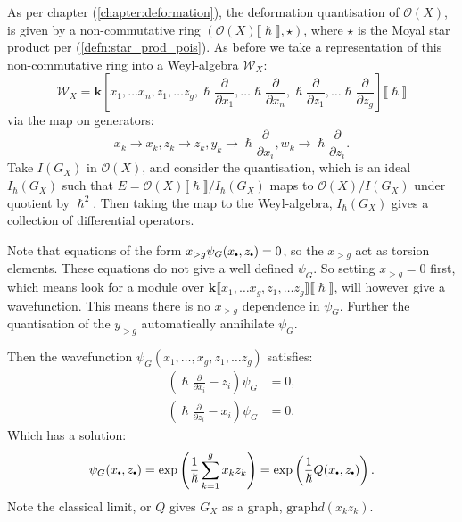     As per chapter (\ref{chapter:deformation}), the deformation quantisation of \( \mathcal{O}(X)\), is given by a  non-commutative ring \(( \mathcal{O}(X)\lBrack \hslash \rBrack, \star)\), where \( \star\) is the Moyal star product per (\ref{defn:star_prod_pois}).
    As before we take a representation of this non-commutative ring into a Weyl-algebra \( \mathcal{W}_X\):
    \[ \mathcal{W}_X = \mathbf{k}[x_1, \dots x_n, z_1, \dots z_g, \hslash \frac{\partial}{\partial x_1}, \dots \hslash \frac{\partial}{\partial x_n}, \hslash \frac{\partial}{\partial z_1}, \dots \hslash \frac{\partial}{\partial z_g}] \lBrack \hslash \rBrack \]
    via the map on generators:
    \[ x_k \rightarrow x_k, z_k \rightarrow z_k, y_k \rightarrow \hslash \frac{\partial}{\partial x_i},  w_k \rightarrow \hslash \frac{\partial}{\partial z_i}.\] 
    Take \(I(G_X)\) in \(\mathcal{O}(X)\), and consider the quantisation, which is an ideal \( I_{\hslash} (G_X)\) such that \( E=\mathcal{O}(X)\lBrack \hslash \rBrack/ I_{\hslash}(G_X) \) maps to \(\mathcal{O}(X)/ I(G_X)\) under quotient by \(\hslash^2\). Then taking the map to the Weyl-algebra, \( I_{\hslash}(G_X)\) gives a collection of differential operators.
    
    Note that equations of the form \( x_{> g} \psi_G(x_{\sbt},z_{\sbt}) = 0\), so the \(x_{>g}\) act as torsion elements. These equations do not give a well defined \( \psi_G\). So setting \( x_{>g} =0\) first, which means look for a module over \( \mathbf{k} \lBrack x_1 , \dots x_g, z_1, \dots z_g\rBrack \lBrack \hslash \rBrack\), will however give a wavefunction. This means there is no \( x_{>g}\) dependence in \( \psi_G\). Further the quantisation of the \(y_{>g}\) automatically annihilate \( \psi_G\).
    
    Then the wavefunction \( \psi_G(x_1, \dots , x_g, z_1, \dots z_g)\) satisfies:
    \begin{align*}
        \left( \hslash \frac{\partial}{\partial x_i } -z_i \right)\psi_G &= 0,\\
        \left( \hslash \frac{\partial}{\partial z_i } - x_i \right)  \psi_G &= 0.
    \end{align*}
    Which has a solution:
    \begin{equation} 
    \label{eqn:psigextgdim}
    \psi_G(x_{\sbt}, z_{\sbt}) = \exp\left(\frac{1}{\hslash} \sum_{k=1}^g x_k z_k \right) = \exp\left( \frac{1}{\hslash} Q(x_{\sbt},z_{\sbt})  \right).
    \end{equation}
    Note the classical limit, or \(Q\) gives \(G_X\) as a graph, \( \mathrm{graph} d (x_k z_k)\).
    
